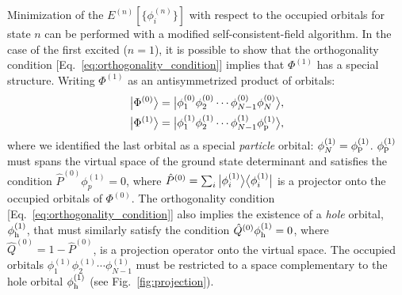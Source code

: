 \documentclass[12pt]{article}
\newcommand{\bra}[2][0]
{\ifthenelse{\equal{#1}{0}}{\left\langle #2 \right|}
{\ifthenelse{\equal{#1}{1}}{\big\langle #2 \big|}
{\ifthenelse{\equal{#1}{2}}{\Big\langle #2 \Big|}
{\ifthenelse{\equal{#1}{3}}{\bigg\langle #2 \bigg|}
{\ifthenelse{\equal{#1}{4}}{\Bigg\langle #2 \Bigg|}
{Error}}}}}
}
\newcommand{\ket}[2][0]
{\ifthenelse{\equal{#1}{0}}{\left| #2 \right\rangle}
{\ifthenelse{\equal{#1}{1}}{\big| #2 \big\rangle}
{\ifthenelse{\equal{#1}{2}}{\Big| #2 \Big\rangle}
{\ifthenelse{\equal{#1}{3}}{\bigg| #2 \bigg\rangle}
{\ifthenelse{\equal{#1}{4}}{\Bigg| #2 \Bigg\rangle}
{Error}}}}}
}
\begin{document}
Minimization of the $E^{(n)}[\{\phi^{(n)}_i\}]$ with respect to the occupied orbitals for state $n$ can be performed with a modified self-consistent-field algorithm.\cite{evangelista_orthogonality_2013}
In the case of the first excited ($n = 1$), it is possible to show that the orthogonality condition [Eq.~\eqref{eq:orthogonality_condition}] implies that $\Phi^{(1)}$ has a special structure.
Writing $\Phi^{(1)}$ as an antisymmetrized product of orbitals:
\begin{align}
\ket[1]{\Phi^{(0)}} = \ket[1]{\phi^{(0)}_1 \phi^{(0)}_2 \cdots \phi^{(0)}_{N-1} \phi^{(0)}_N},\\
\ket[1]{\Phi^{(1)}} = \ket[1]{\phi^{(1)}_1 \phi^{(1)}_2 \cdots \phi^{(1)}_{N-1} \phi^{(1)}_{\rm p}},
\end{align}
where we identified the last orbital as a special \textit{particle} orbital: $\phi^{(1)}_N = \phi^{(1)}_{\rm p}$.
$\phi^{(1)}_{\rm p}$ must spans the virtual space of the ground state determinant and satisfies the condition $\hat{P}^{(0)}\phi_p^{(1)} = 0$, where $\hat{P}^{(0)} = \sum_{i} \ket[1]{\phi_i^{(1)}}\bra[1]{\phi_i^{(1)}}$ is a projector onto the occupied orbitals of $\Phi^{(0)}$.
The orthogonality condition [Eq.~\eqref{eq:orthogonality_condition}] also implies the existence of a \textit{hole} orbital, $\phi^{(1)}_{\rm h}$, that must similarly satisfy the condition $\hat{Q}^{(0)}\phi_{\rm h}^{(1)} = 0$, where $\hat{Q}^{(0)} = 1 - \hat{P}^{(0)}$, is a projection operator onto the virtual space.
The occupied orbitals $\phi^{(1)}_1 \phi^{(1)}_2 \cdots \phi^{(1)}_{N-1}$ must be restricted to a space complementary to the hole orbital $\phi_{\rm h}^{(1)}$ (see Fig.~\ref{fig:projection}).
\end{document}
